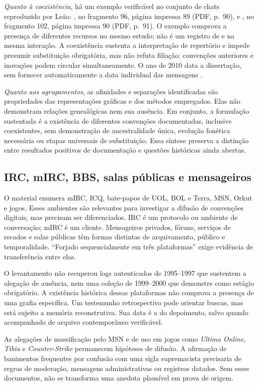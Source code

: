 \emph{Quanto à coexistência}, há um exemplo verificável no conjunto de chats reproduzido por Leão: , no fragmento 96, página impressa 89 (PDF, p.~90), e , no fragmento 102, página impressa 90 (PDF, p.~91). O exemplo comprova a presença de diferentes recursos no mesmo estudo; não é um registro de  e  na mesma interação. A coexistência sustenta a interpretação de repertório e impede presumir substituição obrigatória, mas não refuta filiação: convenções anteriores e inovações podem circular simultaneamente. O ano de 2010 data a dissertação, sem fornecer automaticamente a data individual das mensagens \cite{leao2010}.

\emph{Quanto aos agrupamentos}, as afinidades e separações identificadas são propriedades das representações gráficas e dos métodos empregados. Elas não demonstram relações genealógicas nem sua ausência. Em conjunto, a formulação sustentada é a existência de diferentes convenções documentadas, inclusive coexistentes, sem demonstração de ancestralidade única, evolução fonética necessária ou etapas universais de substituição. Essa síntese preserva a distinção entre resultados positivos de documentação e questões históricas ainda abertas.

\subsection{IRC, mIRC, BBS, salas públicas e mensageiros}
O material enumera mIRC, ICQ, bate-papos de UOL, BOL e Terra, MSN, Orkut e jogos. Esses ambientes são relevantes para investigar a difusão de convenções digitais, mas precisam ser diferenciados. IRC é um protocolo ou ambiente de conversação; mIRC é um cliente. Mensageiros privados, fóruns, serviços de recados e salas públicas têm formas distintas de arquivamento, público e temporalidade. ``Forjado sequencialmente em três plataformas'' exige evidência de transferência entre elas.

O levantamento não recuperou logs autenticados de 1995--1997 que sustentem a alegação de ausência, nem uma coleção de 1999--2000 que demonstre  como estágio obrigatório. A existência histórica dessas plataformas não comprova a presença de uma grafia específica. Um testemunho retrospectivo pode orientar buscas, mas está sujeito a memória reconstrutiva. Sua data é a do depoimento, salvo quando acompanhado de arquivo contemporâneo verificável.

As alegações de massificação pelo MSN e de uso em jogos como \textit{Ultima Online}, \textit{Tibia} e \textit{Counter-Strike} permanecem hipóteses de difusão. A afirmação de banimentos frequentes por confusão com uma sigla supremacista precisaria de regras de moderação, mensagens administrativas ou registros datados. Sem esses documentos, não se transforma uma anedota plausível em prova de origem.

